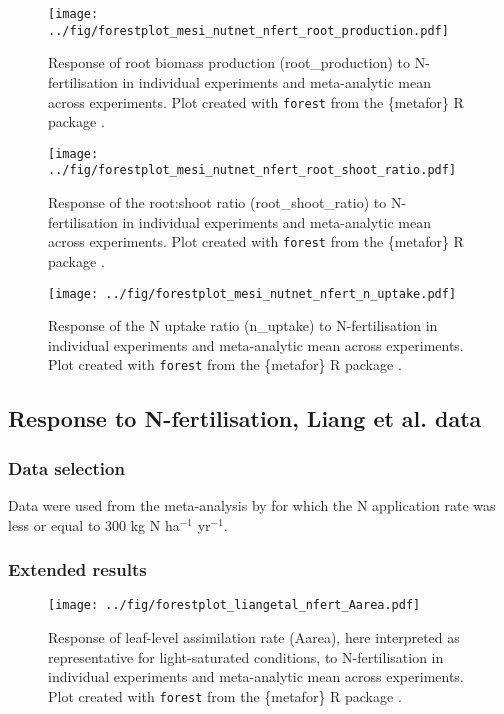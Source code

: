 \documentclass{myreport}
\begin{document}
\begin{figure}[h]
\centering
\texttt{[image: ../fig/forestplot\_mesi\_nutnet\_nfert\_root\_production.pdf]}
\caption{Response of root biomass production (root\_production) to N-fertilisation in individual experiments and meta-analytic mean across experiments. Plot created with \texttt{forest} from the \{metafor\} R package \cite{viechtbauer_conducting_2010}.}
\end{figure}

\begin{figure}[h]
\centering
\texttt{[image: ../fig/forestplot\_mesi\_nutnet\_nfert\_root\_shoot\_ratio.pdf]}
\caption{Response of the root:shoot ratio (root\_shoot\_ratio) to N-fertilisation in individual experiments and meta-analytic mean across experiments. Plot created with \texttt{forest} from the \{metafor\} R package \cite{viechtbauer_conducting_2010}.}
\end{figure}

\begin{figure}[h]
\centering
\texttt{[image: ../fig/forestplot\_mesi\_nutnet\_nfert\_n\_uptake.pdf]}
\caption{Response of the N uptake ratio (n\_uptake) to N-fertilisation in individual experiments and meta-analytic mean across experiments. Plot created with \texttt{forest} from the \{metafor\} R package \cite{viechtbauer_conducting_2010}.}
\end{figure}

\clearpage

\subsection{Response to N-fertilisation, Liang et al. data}

\subsubsection{Data selection}

Data were used from the meta-analysis by \citet{liang_global_2020} for which the N application rate was less or equal to 300 kg N ha$^{-1}$ yr$^{-1}$.

\subsubsection{Extended results}

\begin{figure}[h]
\centering
\texttt{[image: ../fig/forestplot\_liangetal\_nfert\_Aarea.pdf]}
\caption{Response of leaf-level assimilation rate (Aarea), here interpreted as representative for light-saturated conditions, to N-fertilisation in individual experiments and meta-analytic mean across experiments. Plot created with \texttt{forest} from the \{metafor\} R package \cite{viechtbauer_conducting_2010}.}
\end{figure}
\end{document}

